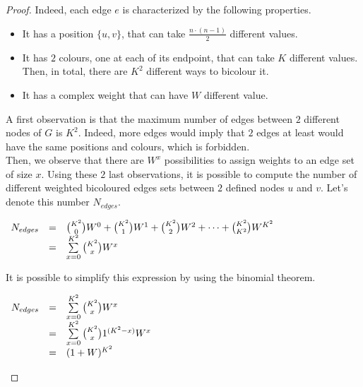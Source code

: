 \begin{proof}
    Indeed, each edge $e$ is characterized by the following properties.
    \begin{itemize}
        \item It has a position $\{u, v\}$, that can take $\frac{n \cdot (n -1)}{2}$ different values.
        \item It has $2$ colours, one at each of its endpoint, that can take $K$ different values.
            Then, in total, there are $K^2$ different ways to bicolour it.
        \item It has a complex weight that can have $W$ different value.
    \end{itemize}

    A first observation is that the maximum number of edges between $2$ different nodes of $G$ is $K^2$.
    Indeed, more edges would imply that $2$ edges at least would have the same positions and colours, which is forbidden.\\

    Then, we observe that there are $W^x$ possibilities to assign weights to an edge set of size $x$.
    Using these $2$ last observations, it is possible to compute the number of different weighted bicoloured edges sets between $2$ defined nodes $u$ and $v$.
    Let's denote this number $N_{edges}$.

    \begin{center}
        $\begin{array}{r c l}
             N_{edges} & = & {K^2 \choose 0} W^0 + {K^2 \choose 1} W^1 + {K^2 \choose 2} W^2 + \cdots + {K^2 \choose K^2} W^{K^2} \\
             & = & \sum\limits_{x=0}^{K^2} {K^2 \choose x} W^x
        \end{array}$
    \end{center}

    It is possible to simplify this expression by using the binomial theorem. \cite{wikipediaBinomialTheorem}

    \begin{center}
        $\begin{array}{r c l}
             N_{edges} & = & \sum\limits_{x=0}^{K^2} {K^2 \choose x} W^x               \\
             & = & \sum\limits_{x=0}^{K^2} {K^2 \choose x} 1^{(K^2 - x)} W^x \\
             & = & (1 + W)^{K^2}
        \end{array}$
    \end{center}


\end{proof}
